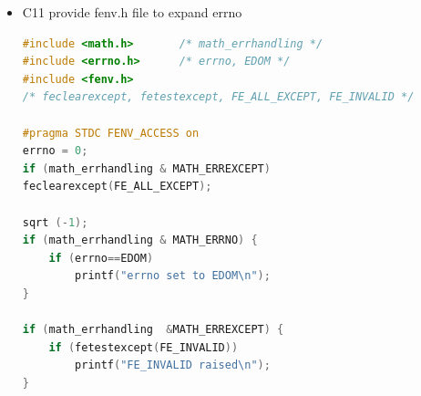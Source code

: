 \documentclass[a4paper,11pt,twoside]{book}
\begin{document}
\begin{itemize}
\item C11 provide fenv.h file to expand errno
\begin{lstlisting}[frame=single, language=c++]
#include <math.h>       /* math_errhandling */
#include <errno.h>      /* errno, EDOM */
#include <fenv.h>
/* feclearexcept, fetestexcept, FE_ALL_EXCEPT, FE_INVALID */
	
#pragma STDC FENV_ACCESS on
errno = 0;
if (math_errhandling & MATH_ERREXCEPT)
feclearexcept(FE_ALL_EXCEPT);
	
sqrt (-1);
if (math_errhandling & MATH_ERRNO) {
	if (errno==EDOM) 
		printf("errno set to EDOM\n");
}
	
if (math_errhandling  &MATH_ERREXCEPT) {
	if (fetestexcept(FE_INVALID)) 
		printf("FE_INVALID raised\n");
}
\end{lstlisting}
	
\end{itemize}
\end{document}
